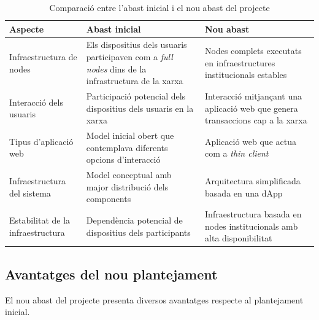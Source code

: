 \documentclass[12pt,a4paper]{article}
\begin{document}
\begin{table}[h]

\centering

\begin{tabular}{|p{4cm}|p{5cm}|p{5cm}|}
\hline

\textbf{Aspecte} & \textbf{Abast inicial} & \textbf{Nou abast} \\

\hline

Infraestructura de nodes &
Els dispositius dels usuaris participaven com a \textit{full nodes} dins de la infrastructura de la xarxa&
Nodes complets executats en infraestructures institucionals estables \\

\hline

Interacció dels usuaris &
Participació potencial dels dispositius dels usuaris en la xarxa &
Interacció mitjançant una aplicació web que genera transaccions cap a la xarxa \\

\hline

Tipus d'aplicació web &
Model inicial obert que contemplava diferents opcions d'interacció &
Aplicació web que actua com a \textit{thin client} \\

\hline

Infraestructura del sistema &
Model conceptual amb major distribució dels components &
Arquitectura simplificada basada en una dApp \\

\hline

Estabilitat de la infraestructura &
Dependència potencial de dispositius dels participants &
Infraestructura basada en nodes institucionals amb alta disponibilitat \\

\hline

\end{tabular}

\caption{Comparació entre l'abast inicial i el nou abast del projecte}
\label{tab:comparacio_abast}

\end{table}

\subsection{Avantatges del nou plantejament}

El nou abast del projecte presenta diversos avantatges respecte al plantejament inicial.
\end{document}
